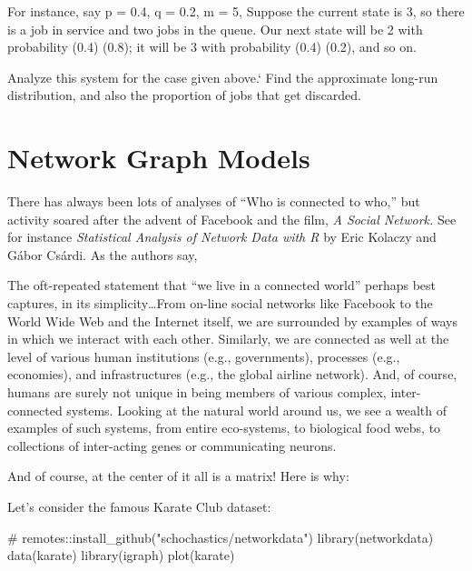 \documentclass[
  letterpaper,
  DIV=11,
  numbers=noendperiod,
  oneside]{scrreprt}
\newenvironment{Shaded}{\begin{snugshade}}{\end{snugshade}}
\newcommand{\CommentTok}[1]{\textcolor[rgb]{0.37,0.37,0.37}{#1}}
\newcommand{\FunctionTok}[1]{\textcolor[rgb]{0.28,0.35,0.67}{#1}}
\newcommand{\NormalTok}[1]{\textcolor[rgb]{0.00,0.23,0.31}{#1}}
\begin{document}
For instance, say p = 0.4, q = 0.2, m = 5, Suppose the current state is
3, so there is a job in service and two jobs in the queue. Our next
state will be 2 with probability (0.4) (0.8); it will be 3 with
probability (0.4) (0.2), and so on.

Analyze this system for the case given above.` Find the approximate
long-run distribution, and also the proportion of jobs that get
discarded.

\hypertarget{network-graph-models}{%
\section{Network Graph Models}\label{network-graph-models}}

There has always been lots of analyses of ``Who is connected to who,''
but activity soared after the advent of Facebook and the film, \emph{A
Social Network.} See for instance \emph{Statistical Analysis of Network
Data with R} by Eric Kolaczy and Gábor Csárdi. As the authors say,

The oft-repeated statement that ``we live in a connected world'' perhaps
best captures, in its simplicity\ldots From on-line social networks like
Facebook to the World Wide Web and the Internet itself, we are
surrounded by examples of ways in which we interact with each other.
Similarly, we are connected as well at the level of various human
institutions (e.g., governments), processes (e.g., economies), and
infrastructures (e.g., the global airline network). And, of course,
humans are surely not unique in being members of various complex,
inter-connected systems. Looking at the natural world around us, we see
a wealth of examples of such systems, from entire eco-systems, to
biological food webs, to collections of inter-acting genes or
communicating neurons.

And of course, at the center of it all is a matrix! Here is why:

Let's consider the famous Karate Club dataset:

{\marginnote{\begin{footnotesize}\end{footnotesize}}}

\begin{Shaded}
\begin{Highlighting}[]
\CommentTok{\# remotes::install\_github("schochastics/networkdata") }
\FunctionTok{library}\NormalTok{(networkdata)}
\FunctionTok{data}\NormalTok{(karate)}
\FunctionTok{library}\NormalTok{(igraph)}
\FunctionTok{plot}\NormalTok{(karate)}
\end{Highlighting}
\end{Shaded}
\end{document}
